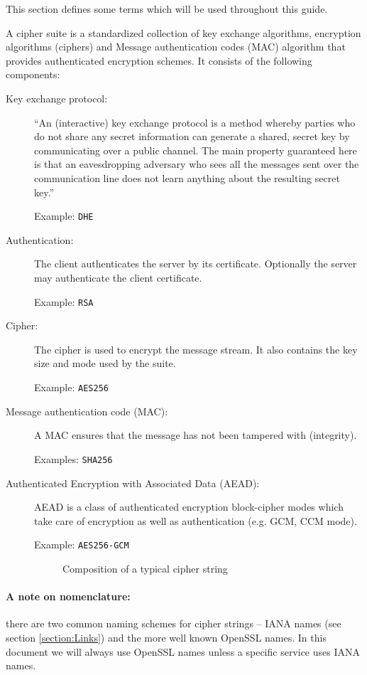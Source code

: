 
This section defines some terms which will be used throughout this guide.


A cipher suite is a standardized collection of key exchange algorithms, encryption 
algorithms (ciphers) and Message authentication codes (MAC) algorithm that provides
authenticated encryption schemes. It consists of the following components:

\begin{description}

\item[Key exchange protocol:]
``An (interactive) key exchange protocol is a method whereby parties who do not 
share any secret information can generate a shared, secret key by communicating 
over a public channel. The main property guaranteed here is that an 
eavesdropping adversary who sees all the messages sent over the communication 
line does not learn anything about the resulting secret key.''~\cite{katz2008introduction}

Example: \texttt{DHE}

\item[Authentication:]
The client authenticates the server by its certificate. Optionally the server 
may authenticate the client certificate.

Example: \texttt{RSA}

\item[Cipher:]
The cipher is used to encrypt the message stream. It also contains the key size
and mode used by the suite.

Example: \texttt{AES256}

\item[Message authentication code (MAC):]
A MAC ensures that the message has not been tampered with (integrity).

Examples: \texttt{SHA256}

\item[Authenticated Encryption with Associated Data (AEAD):]
AEAD is a class of authenticated encryption block-cipher modes
which take care of encryption as well as authentication (e.g. GCM, CCM mode). 

Example: \texttt{AES256-GCM}



\begin{figure}[h]
\caption{Composition of a typical cipher string}
\end{figure}
\end{description}
%
\paragraph*{A note on nomenclature:} there are two common naming schemes for cipher strings -- IANA names (see section \ref{section:Links}) and the more well known OpenSSL names. In this document we will always use OpenSSL names unless a specific service uses IANA names.
